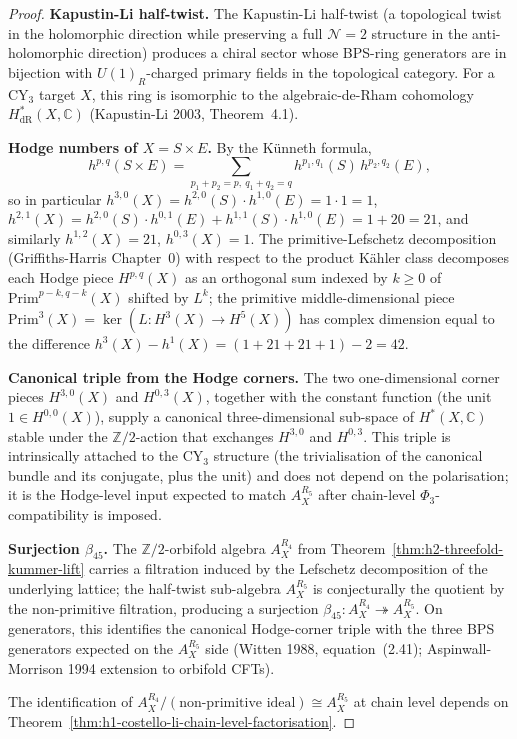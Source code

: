 \begin{proof}
\textbf{Kapustin-Li half-twist.} The Kapustin-Li half-twist (a
topological twist in the holomorphic direction while preserving a full
$\mathcal{N} = 2$ structure in the anti-holomorphic direction) produces a
chiral sector whose BPS-ring generators are in bijection with
$U(1)_R$-charged primary fields in the topological category. For a CY$_3$
target $X$, this ring is isomorphic to the algebraic-de-Rham cohomology
$H^*_{\mathrm{dR}}(X, \mathbb{C})$ (Kapustin-Li 2003, Theorem~4.1).

\textbf{Hodge numbers of $X = S \times E$.} By the K\"unneth formula,
\[
 h^{p,q}(S \times E) = \sum_{p_1 + p_2 = p,\ q_1 + q_2 = q}
 h^{p_1, q_1}(S) \, h^{p_2, q_2}(E),
\]
so in particular $h^{3, 0}(X) = h^{2, 0}(S) \cdot h^{1, 0}(E) = 1 \cdot 1 = 1$,
$h^{2, 1}(X) = h^{2, 0}(S) \cdot h^{0, 1}(E) + h^{1, 1}(S) \cdot h^{1, 0}(E) = 1 + 20 = 21$,
and similarly $h^{1, 2}(X) = 21$, $h^{0, 3}(X) = 1$. The primitive-Lefschetz
decomposition (Griffiths-Harris Chapter~0) with respect to the product
K\"ahler class decomposes each Hodge piece $H^{p, q}(X)$ as an orthogonal
sum indexed by $k \ge 0$ of $\mathrm{Prim}^{p - k, q - k}(X)$ shifted by
$L^k$; the primitive middle-dimensional piece $\mathrm{Prim}^{3}(X) =
\ker(L: H^3(X) \to H^5(X))$ has complex dimension equal to the difference
$h^3(X) - h^1(X) = (1 + 21 + 21 + 1) - 2 = 42$.

\textbf{Canonical triple from the Hodge corners.} The two
one-dimensional corner pieces $H^{3, 0}(X)$ and $H^{0, 3}(X)$, together
with the constant function (the unit $1 \in H^{0, 0}(X)$), supply a
canonical three-dimensional sub-space of $H^*(X, \mathbb{C})$ stable
under the $\mathbb{Z}/2$-action that exchanges $H^{3, 0}$ and
$H^{0, 3}$. This triple is intrinsically attached to the CY$_3$ structure
(the trivialisation of the canonical bundle and its conjugate, plus the
unit) and does not depend on the polarisation; it is the Hodge-level input
expected to match $A_X^{R_5}$ after chain-level $\Phi_3$-compatibility is
imposed.

\textbf{Surjection $\beta_{45}$.} The $\mathbb{Z}/2$-orbifold
algebra $A_X^{R_4}$ from Theorem~\ref{thm:h2-threefold-kummer-lift} carries
a filtration induced by the Lefschetz decomposition of the underlying
lattice; the half-twist sub-algebra $A_X^{R_5}$ is conjecturally the
quotient by the non-primitive filtration, producing a surjection
$\beta_{45}: A_X^{R_4} \twoheadrightarrow A_X^{R_5}$. On generators, this
identifies the canonical Hodge-corner triple with the three BPS generators
expected on the $A_X^{R_5}$ side (Witten 1988, equation~(2.41);
Aspinwall-Morrison 1994 extension to orbifold CFTs).

The identification of $A_X^{R_4} / (\text{non-primitive ideal}) \cong
A_X^{R_5}$ at chain level depends on
Theorem~\ref{thm:h1-costello-li-chain-level-factorisation}.
\end{proof}

